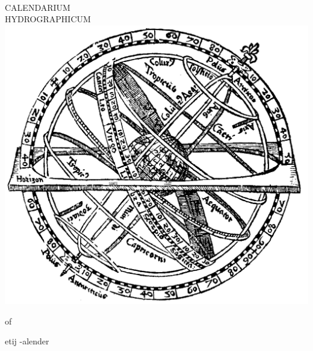 


\begingroup
\thispagestyle{empty}
\fontsize{10pt}{10pt}
\leading{3mm}

\centering
~\vspace{8\baselineskip}\\


{%

{\latinInitialsFont C}ALENDARIUM\\
{\latinInitialsFont H}YDROGRAPHICUM\\[\baselineskip]

\includegraphics[width=0.8\linewidth]{art/armillarsphere.png}\\[\baselineskip]

}{%

{\texturaFont of}

}{%

{\texturaFont{}etij\hskip 1mm -\hskip 4mmalender}

{\ornamentsFont }

}{%


}{%


}{%

}%


\endgroup

